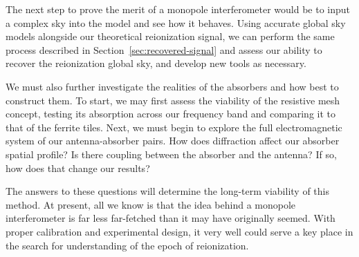 The next step to prove the merit of a monopole interferometer would be to input 
a complex sky into the model and see how it behaves. Using accurate global sky 
models alongside our theoretical reionization signal, we can perform the same 
process described in Section~\ref{sec:recovered-signal} and assess our ability 
to recover the reionization global sky, and develop new tools as necessary.

We must also further investigate the realities of the absorbers and how best to 
construct them. To start, we may first assess the viability of the resistive 
mesh concept, testing its absorption across our frequency band and comparing it 
to that of the ferrite tiles. Next, we must begin to explore the full 
electromagnetic system of our antenna-absorber pairs. How does diffraction 
affect our absorber spatial profile? Is there coupling between the absorber and 
the antenna? If so, how does that change our results?

The answers to these questions will determine the long-term viability of this 
method. At present, all we know is that the idea behind a monopole 
interferometer is far less far-fetched than it may have originally seemed. With 
proper calibration and experimental design, it very well could serve a key 
place in the search for understanding of the epoch of reionization.
